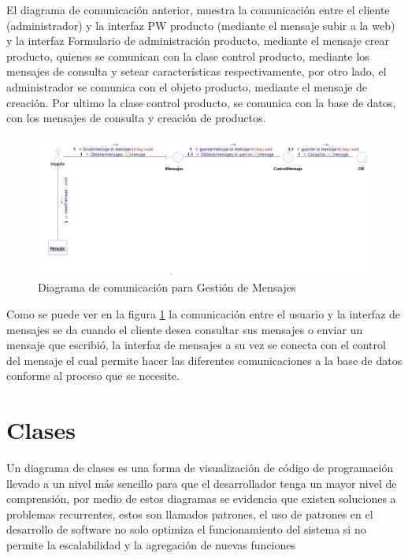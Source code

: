 El diagrama de comunicación anterior, muestra la comunicación entre el cliente (administrador) y la interfaz PW producto (mediante el mensaje subir a la web) y la interfaz Formulario de administración producto, mediante el mensaje crear producto, quienes se comunican con la clase control producto, mediante los mensajes de consulta y setear características respectivamente, por otro lado, el administrador se comunica con el objeto producto, mediante el mensaje de creación. Por ultimo la clase control producto, se comunica con la base de datos, con los mensajes de consulta y creación de productos.

\begin{figure}[th!]
	\centering
	\includegraphics[width=1.1\linewidth]{arquitectura/imagenes/Diagrama_comunicacion_cc}
	\caption{Diagrama de comunicación para Gestión de Mensajes}
	\label{fig:diagramaComunicacionMensajes}
\end{figure}

Como se puede ver en la figura \ref{fig:diagramaComunicacionMensajes} la comunicación entre el usuario y la interfaz de mensajes se da cuando el cliente desea consultar sus mensajes o enviar un mensaje que escribió, la interfaz de mensajes a su vez se conecta con el control del mensaje el cual permite hacer las diferentes comunicaciones a la base de datos conforme al proceso que se necesite.
\newpage

\section{Clases}
Un diagrama de clases es una forma de visualización de código de programación llevado a un nivel más sencillo para que el desarrollador tenga un mayor nivel de comprensión, por medio de estos diagramas se evidencia que existen soluciones a problemas recurrentes, estos son llamados patrones, el uso de patrones en el desarrollo de software no solo optimiza el funcionamiento del sistema si no permite la escalabilidad y la agregación de nuevas funciones 

